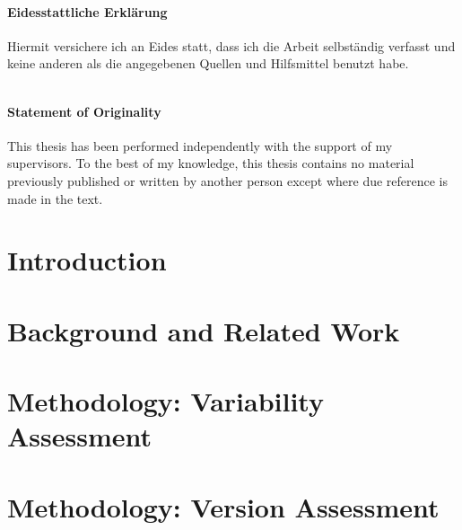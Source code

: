 \documentclass[
	12pt,
	a4paper,
	oneside,
	openright,
	listof=totoc%
]{scrbook}
\begin{document}

\newpage
\thispagestyle{empty}


 $$\qquad$$
 $$\qquad$$
 $$\qquad$$
  $$\qquad$$
 $$\qquad$$
 $$\qquad$$
 
\subsubsection*{Eidesstattliche Erklärung}
 Hiermit versichere ich an Eides statt, dass ich die Arbeit selbständig verfasst
 und keine anderen als die angegebenen Quellen und Hilfsmittel benutzt habe.

\vspace{1.3cm}

 $$\qquad$$
 $$\qquad$$
 $$\qquad$$
\subsubsection*{Statement of Originality}
This thesis has been performed independently with the support of my
supervisors. To the best of my knowledge, this thesis contains no material previously published or written
by another person except where due reference is made in the text.

\vspace{1.3cm}


\clearpage
\setcounter{page}{1}
\tableofcontents
\listoffigures
\listoftables
{}
\chapter{Introduction}\label{chapter:1}
\setcounter{page}{1}


\chapter{Background and Related Work}\label{chapter:2}


\chapter{Methodology: Variability Assessment}\label{sec:chapter:3}


\chapter{Methodology: Version Assessment}\label{chapter:4}

\end{document}
